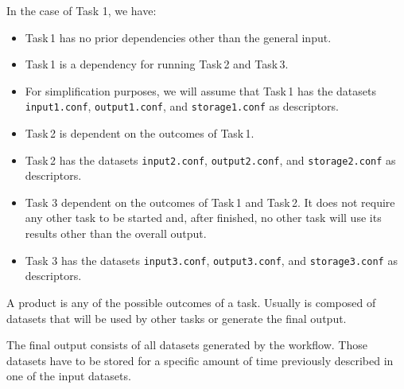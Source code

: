 \documentclass[a4paper]{article}
\begin{document}
{{{{\begin{description}
In the case of Task 1, we have:

\begin{itemize}

\item Task\,1 has no prior dependencies other than the general input.

\item Task\,1 is a dependency for running Task\,2 and Task\,3.

\item For simplification purposes, we will assume that Task\,1 has the datasets \texttt{input1.conf}, \texttt{output1.conf}, and \texttt{storage1.conf} as descriptors.

\end{itemize}

\item[Task 2]

\begin{itemize}

\item Task\,2 is dependent on the outcomes of Task\,1.

\item Task\,2 has the datasets \texttt{input2.conf}, \texttt{output2.conf}, and \texttt{storage2.conf} as descriptors.

\end{itemize}

\item[Task 3]

\begin{itemize}

\item Task 3 dependent on the outcomes of Task\,1 and Task\,2. It does not require any other task to be started and, after finished, no other task will use its results other than the overall output.

\item Task 3 has the datasets \texttt{input3.conf}, \texttt{output3.conf}, and \texttt{storage3.conf} as descriptors.

\end{itemize}

\item[Product]

A product is any of the possible outcomes of a task. Usually is composed of datasets that will be used by other tasks or generate the final output.

\item[Final Output]

The final output consists of all datasets generated by the workflow. Those datasets have to be stored for a specific amount of time previously described in one of the input datasets.


\end{description}}}}}
\end{document}

